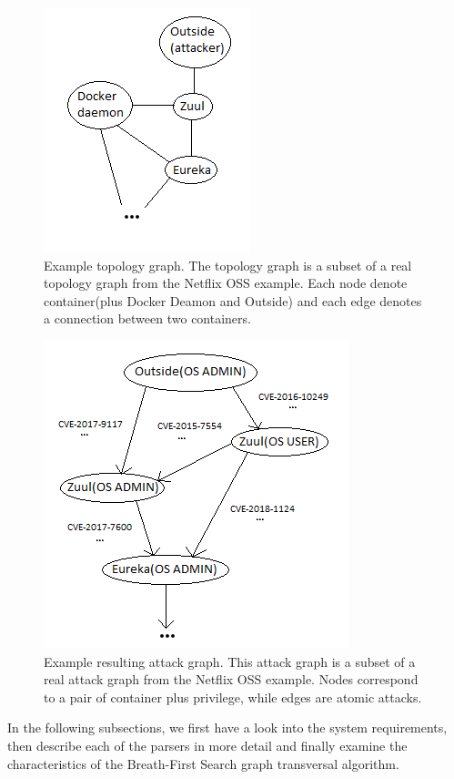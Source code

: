 \documentclass[letterpaper, 10 pt, conference]{ieeeconf}  %
\begin{document}
\begin{figure}
	\includegraphics[]{Topology_graph}
	\caption{Example topology graph. The topology graph is a subset of a real topology graph from the Netflix OSS example. Each node denote container(plus Docker Deamon and Outside) and each edge denotes a connection between two containers.}
	\label{TopologyGraph}
\end{figure}

\begin{figure}
	\includegraphics[]{Attack_graph}
	\caption{Example resulting attack graph. This attack graph is a subset of a real attack graph from the Netflix OSS example. Nodes correspond to a pair of container plus privilege, while edges are atomic attacks.}
	\label{AttackGraph}
\end{figure}


In the following subsections, we first have a look into the system requirements, then describe each of the parsers in more detail and finally examine the characteristics of the Breath-First Search graph transversal algorithm.
\end{document}
